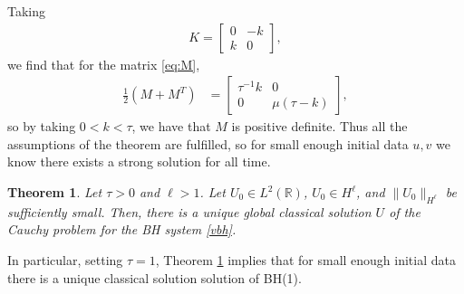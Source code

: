 \documentclass{article}
\theoremstyle{plain}
\newtheorem{theorem}{Theorem}
\theoremstyle{definition}
\numberwithin{theorem}{section}
\begin{document}
Taking
\begin{align*}
    K = \begin{bmatrix} 0 & -k \\ k & 0 \end{bmatrix},
\end{align*}
we find that for the matrix \eqref{eq:M},
\begin{align}
    \frac{1}{2}\left(M + M^T\right) & = \begin{bmatrix} \tau^{-1} k & 0 \\ 0 & \mu(\tau-k) \end{bmatrix},
\end{align}
so by taking $0 < k < \tau$, we have that $M$ is positive definite.  Thus all the assumptions
of the theorem are fulfilled, so for small enough initial data $u, v$ we know there exists
a strong solution for all time.

\begin{theorem}
\label{thm:burgers_small_data}
    Let
    $\tau > 0$ and $\ell > 1$.
    Let $U_0 \in L^2(\mathbb{R})$,
    $U_0 \in H^\ell$, and $\|U_0\|_{H^\ell}$ be sufficiently small.
    Then, there is a unique global classical solution $U$ of the Cauchy problem for the BH system \eqref{vbh}.
\end{theorem}
In particular, setting $\tau=1$, Theorem \ref{thm:burgers_small_data} implies that for small
enough initial data there is a unique classical solution solution of BH(1).
\end{document}
